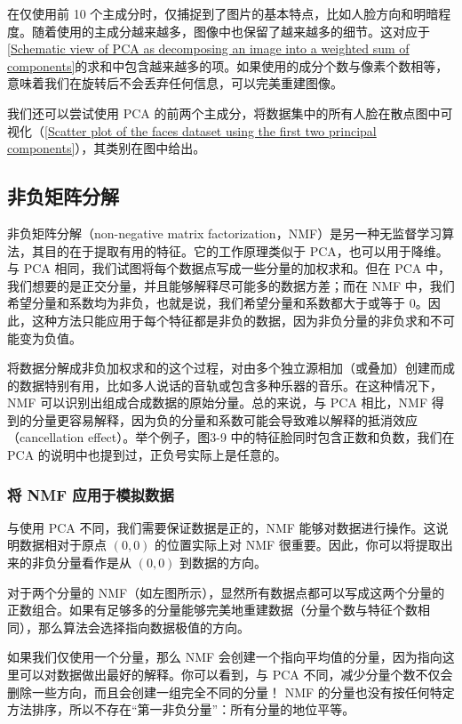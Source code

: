 在仅使用前 10 个主成分时，仅捕捉到了图片的基本特点，比如人脸方向和明暗程度。随着使用的主成分越来越多，图像中也保留了越来越多的细节。这对应于\autoref{Schematic view of PCA as decomposing an image into a weighted sum of components}的求和中包含越来越多的项。如果使用的成分个数与像素个数相等，意味着我们在旋转后不会丢弃任何信息，可以完美重建图像。

我们还可以尝试使用 PCA 的前两个主成分，将数据集中的所有人脸在散点图中可视化（\autoref{Scatter plot of the faces dataset using the first two principal components}），其类别在图中给出。


\subsection{非负矩阵分解}
非负矩阵分解（non-negative matrix factorization，NMF）是另一种无监督学习算法，其目的在于提取有用的特征。它的工作原理类似于 PCA，也可以用于降维。与 PCA 相同，我们试图将每个数据点写成一些分量的加权求和。但在 PCA 中，我们想要的是正交分量，并且能够解释尽可能多的数据方差；而在 NMF 中，我们希望分量和系数均为非负，也就是说，我们希望分量和系数都大于或等于 0。因此，这种方法只能应用于每个特征都是非负的数据，因为非负分量的非负求和不可能变为负值。

将数据分解成非负加权求和的这个过程，对由多个独立源相加（或叠加）创建而成的数据特别有用，比如多人说话的音轨或包含多种乐器的音乐。在这种情况下，NMF 可以识别出组成合成数据的原始分量。总的来说，与 PCA 相比，NMF 得到的分量更容易解释，因为负的分量和系数可能会导致难以解释的抵消效应（cancellation effect）。举个例子，图3-9 中的特征脸同时包含正数和负数，我们在 PCA 的说明中也提到过，正负号实际上是任意的。

\subsubsection{将 NMF 应用于模拟数据}
与使用 PCA 不同，我们需要保证数据是正的，NMF 能够对数据进行操作。这说明数据相对于原点 $(0, 0)$ 的位置实际上对 NMF 很重要。因此，你可以将提取出来的非负分量看作是从 $(0, 0)$ 到数据的方向。


对于两个分量的 NMF（如左图所示），显然所有数据点都可以写成这两个分量的正数组合。如果有足够多的分量能够完美地重建数据（分量个数与特征个数相同），那么算法会选择指向数据极值的方向。

如果我们仅使用一个分量，那么 NMF 会创建一个指向平均值的分量，因为指向这里可以对数据做出最好的解释。你可以看到，与 PCA 不同，减少分量个数不仅会删除一些方向，而且会创建一组完全不同的分量！ NMF 的分量也没有按任何特定方法排序，所以不存在“第一非负分量”：所有分量的地位平等。

